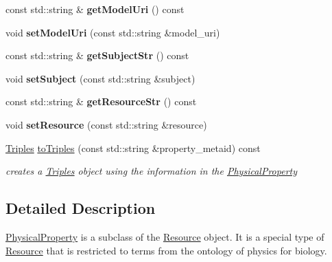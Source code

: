 \begin{DoxyCompactItemize}
const std\+::string \& {\bfseries get\+Model\+Uri} () const
\item 
\mbox{\label{classomexmeta_1_1PhysicalProperty_afd367b237fc93654c59c3b0c203b4640}} 
void {\bfseries set\+Model\+Uri} (const std\+::string \&model\+\_\+uri)
\item 
\mbox{\label{classomexmeta_1_1PhysicalProperty_a4b9ad0a7fe22a3476d7e2f08834bbd74}} 
const std\+::string \& {\bfseries get\+Subject\+Str} () const
\item 
\mbox{\label{classomexmeta_1_1PhysicalProperty_a8bb7c912a21e0e318a9e16d2af1801e5}} 
void {\bfseries set\+Subject} (const std\+::string \&subject)
\item 
\mbox{\label{classomexmeta_1_1PhysicalProperty_a9177d21e829cbd872217ba6f9619d427}} 
const std\+::string \& {\bfseries get\+Resource\+Str} () const
\item 
\mbox{\label{classomexmeta_1_1PhysicalProperty_a420dab52a424d1be5a8610e19407980c}} 
void {\bfseries set\+Resource} (const std\+::string \&resource)
\item 
\hyperlink{classomexmeta_1_1Triples}{Triples} \hyperlink{classomexmeta_1_1PhysicalProperty_a03056210a70ea8446b44de250646eeb5}{to\+Triples} (const std\+::string \&property\+\_\+metaid) const
\begin{DoxyCompactList}\small\item\em creates a \hyperlink{classomexmeta_1_1Triples}{Triples} object using the information in the \hyperlink{classomexmeta_1_1PhysicalProperty}{Physical\+Property} \end{DoxyCompactList}\end{DoxyCompactItemize}


\subsection{Detailed Description}
\hyperlink{classomexmeta_1_1PhysicalProperty}{Physical\+Property} is a subclass of the \hyperlink{classomexmeta_1_1Resource}{Resource} object. It is a special type of \hyperlink{classomexmeta_1_1Resource}{Resource} that is restricted to terms from the ontology of physics for biology.

